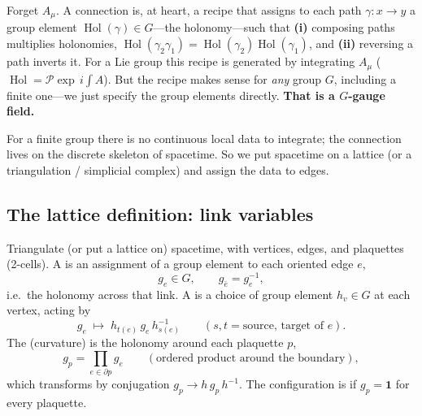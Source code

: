\documentclass[11pt]{article}
\newcommand{\Pexp}{\mathcal{P}\!\exp}        %
\DeclareMathOperator{\Hol}{Hol}              %
\begin{document}
\begin{iintuition}
Forget $A_\mu$. A connection is, at heart, a recipe that assigns to each path
$\gamma:x\to y$ a group element $\Hol(\gamma)\in G$---the holonomy---such that
\textbf{(i)} composing paths multiplies holonomies, $\Hol(\gamma_2\gamma_1) =
\Hol(\gamma_2)\Hol(\gamma_1)$, and \textbf{(ii)} reversing a path inverts it. For a Lie
group this recipe is generated by integrating $A_\mu$ ($\Hol = \Pexp\, i\!\int A$). But
the recipe makes sense for \emph{any} group $G$, including a finite one---we just
specify the group elements directly. \textbf{That is a $G$-gauge field.}
\end{iintuition}

For a finite group there is no continuous local data to integrate; the connection lives
on the discrete skeleton of spacetime. So we put spacetime on a lattice (or a
triangulation / simplicial complex) and assign the data to edges.

\subsection{The lattice definition: link variables}

\begin{ddefinition}
Triangulate (or put a lattice on) spacetime, with vertices, edges, and plaquettes
(2-cells). A  is an assignment of a group element to each
oriented edge $e$,
\[
g_e \in G, \qquad g_{\bar e} = g_e^{-1},
\]
i.e.\ the holonomy across that link. A  is a choice of
group element $h_v\in G$ at each vertex, acting by
\[
g_e \;\longmapsto\; h_{t(e)}\, g_e\, h_{s(e)}^{-1}
\qquad (s,t = \text{source, target of } e).
\]
The  (curvature) is the holonomy around each plaquette $p$,
\[
g_p = \prod_{e\in\partial p} g_e \qquad(\text{ordered product around the boundary}),
\]
which transforms by conjugation $g_p\to h\,g_p\,h^{-1}$. The configuration is
 if $g_p = \mathbf 1$ for every plaquette.
\end{ddefinition}

\begin{center}
\end{center}
\end{document}
